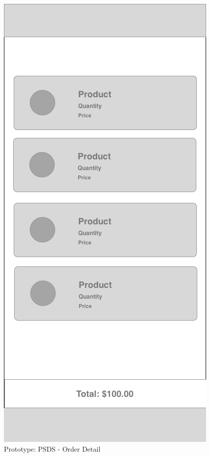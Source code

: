 \begin{figure}[ht]
    \centering
    \includegraphics[scale=0.50]{../images/prototype-psds-order-detail.png}
    \caption{Prototype: PSDS - Order Detail}
    \label{fig:psds-prototype-order-detail}
\end{figure}